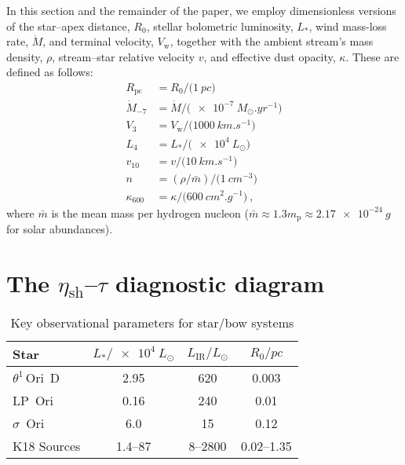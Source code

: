 \documentclass[useAMS, usenatbib, a4paper]{mnras}
\newcommand{\wind}{\ensuremath{_{\text{w}}}}
\newcommand{\thD}{\(\theta^1\)\,Ori~D}
\newcommand\shell{\ensuremath{_{\text{sh}}}}
\begin{document}
In this section and the remainder of the paper, we employ
dimensionless versions of the star--apex distance, \(R_0\), stellar
bolometric luminosity, \(L_*\), wind mass-loss rate, \(\dot{M}\), and
terminal velocity, \(V\wind\), together with the ambient stream's mass
density, \(\rho\), stream--star relative velocity \(v\), and effective
dust opacity, \(\kappa\).  These are defined as follows:
\begin{align*}
  R_{\text{pc}} &= R_0 / \bigl( \SI{1}{pc} \bigr) \\
  \dot{M}_{-7} &= \dot{M} / \bigl(\SI{e-7}{M_\odot.yr^{-1}}\bigr) \\
  V_3 &= V\wind / \bigl(\SI{1000}{km.s^{-1}}\bigr) \\
  L_4 &= L_* / \bigl(\SI{e4}{L_\odot}\bigr) \\
  v_{10} &= v / \bigl( \SI{10}{km.s^{-1}} \bigr) \\
  n &= (\rho / \bar{m}) / \bigl( \SI{1}{cm^{-3}} \bigr) \\
  \kappa_{600} &= \kappa / \bigl( \SI{600}{cm^2.g^{-1}} \bigr) \ ,
\end{align*}
where \(\bar{m}\) is the mean mass per hydrogen nucleon
(\(\bar{m} \approx 1.3 m_{\text{p}} \approx \SI{2.17e-24}{g}\) for solar
abundances).

\section[The eta-tau diagnostic diagram]
{\boldmath The \(\eta\shell\)--\(\tau\) diagnostic diagram}
\label{sec:eta-tau-diagnostic}



\begin{table}
  \centering
  \caption[Observational]{Key observational parameters for star/bow systems}
  \label{tab:observations}
  \begin{tabular}{l S S S}
    \toprule
    Star & {\(L_* / \SI{e4}{L_\odot}\)}
    & {\(L_{\text{IR}} / \si{L_\odot}\)} & {\(R_0 / \si{pc}\)} \\
    \midrule
    \thD & 2.95 & 620 & 0.003 \\
    LP~Ori & 0.16 & 240 & 0.01 \\
    \(\sigma\)~Ori & 6.0 & 15 & 0.12 \\[\smallskipamount]
    K18 Sources & \numrange{1.4}{87} & \numrange{8}{2800} & \numrange{0.02}{1.35} \\
    \bottomrule
  \end{tabular}
\end{table}
\end{document}
